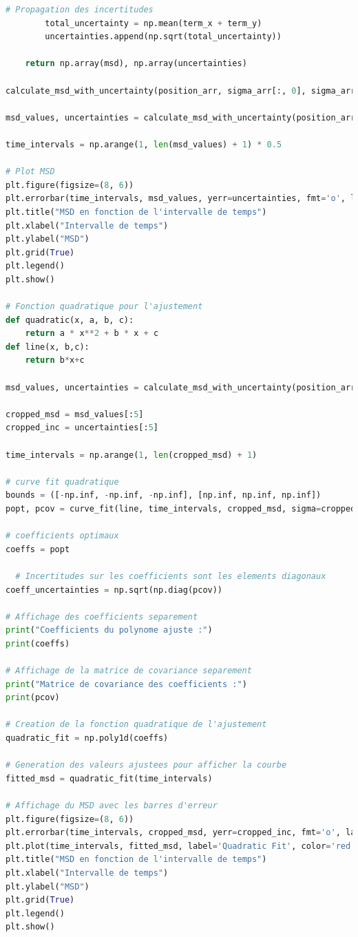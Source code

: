 \documentclass[11pt,letterpaper]{article}
\begin{document}
\begin{lstlisting}[language=python]
        # Propagation des incertitudes
        total_uncertainty = np.mean(term_x + term_y)
        uncertainties.append(np.sqrt(total_uncertainty))

    return np.array(msd), np.array(uncertainties)

calculate_msd_with_uncertainty(position_arr, sigma_arr[:, 0], sigma_arr[:, 1])

msd_values, uncertainties = calculate_msd_with_uncertainty(position_arr, sigma_arr[:, 0], sigma_arr[:, 1])

time_intervals = np.arange(1, len(msd_values) + 1) * 0.5

# Plot MSD
plt.figure(figsize=(8, 6))
plt.errorbar(time_intervals, msd_values, yerr=uncertainties, fmt='o', label='MSD', color='blue')
plt.title("MSD en fonction de l'intervalle de temps")
plt.xlabel("Intervalle de temps")
plt.ylabel("MSD")
plt.grid(True)
plt.legend()
plt.show()

# Fonction quadratique pour l'ajustement
def quadratic(x, a, b, c):
    return a * x**2 + b * x + c
def line(x, b,c):
    return b*x+c

msd_values, uncertainties = calculate_msd_with_uncertainty(position_arr, sigma_arr[:, 0], sigma_arr[:, 1])

cropped_msd = msd_values[:5]
cropped_inc = uncertainties[:5]

time_intervals = np.arange(1, len(cropped_msd) + 1)

# curve fit quadratique
bounds = ([-np.inf, -np.inf, -np.inf], [np.inf, np.inf, np.inf])
popt, pcov = curve_fit(line, time_intervals, cropped_msd, sigma=cropped_inc)

# coefficients optimaux
coeffs = popt

  # Incertitudes sur les coefficients sont les elements diagonaux
coeff_uncertainties = np.sqrt(np.diag(pcov))

# Affichage des coefficients separement
print("Coefficients du polynome ajuste :")
print(coeffs)

# Affichage de la matrice de covariance separement
print("Matrice de covariance des coefficients :")
print(pcov)

# Creation de la fonction quadratique de l'ajustement
quadratic_fit = np.poly1d(coeffs)

# Generation des valeurs ajustees pour afficher la courbe
fitted_msd = quadratic_fit(time_intervals)

# Affichage du MSD avec les barres d'erreur
plt.figure(figsize=(8, 6))
plt.errorbar(time_intervals, cropped_msd, yerr=cropped_inc, fmt='o', label='MSD', color='blue')
plt.plot(time_intervals, fitted_msd, label='Quadratic Fit', color='red', linestyle='--')
plt.title("MSD en fonction de l'intervalle de temps")
plt.xlabel("Intervalle de temps")
plt.ylabel("MSD")
plt.grid(True)
plt.legend()
plt.show()


\end{lstlisting}
\end{document}
